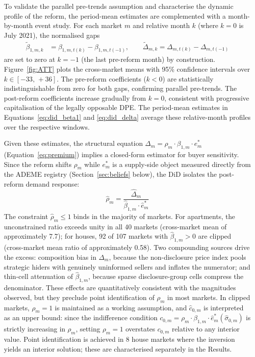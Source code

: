 \documentclass[10pt,letterpaper]{bp-template-concise}
\begin{document}
To validate the parallel pre-trends assumption and characterise the dynamic profile of the reform, the period-mean estimates are complemented with a month-by-month event study. For each market $m$ and relative month $k$ (where $k=0$ is July 2021), the normalised gaps
\begin{align}
\tilde\beta_{1,m,k} &= \beta_{1,m,t(k)} - \beta_{1,m,t(-1)}, \qquad
\tilde\Delta_{m,k}  = \Delta_{m,t(k)}  - \Delta_{m,t(-1)}
\end{align}
are set to zero at $k=-1$ (the last pre-reform month) by construction. Figure~\ref{fig:ATT} plots the cross-market means with 95\% confidence intervals over $k\in[-33,\,+36]$. The pre-reform coefficients ($k<0$) are statistically indistinguishable from zero for both gaps, confirming parallel pre-trends. The post-reform coefficients increase gradually from $k=0$, consistent with progressive capitalisation of the legally opposable DPE. The period-mean estimates in Equations~\eqref{eq:did_beta1} and \eqref{eq:did_delta} average these relative-month profiles over the respective windows.

Given these estimates, the structural equation $\Delta_m = \rho_m\cdot\beta_{1,m}\cdot e^*_m$ (Equation~\eqref{eq:premium}) implies a closed-form estimator for buyer sensitivity. Since the reform shifts $\rho_m$ while $e^*_m$ is a supply-side object measured directly from the ADEME registry (Section~\ref{sec:beliefs} below), the DiD isolates the post-reform demand response:
\begin{equation}
    \hat\rho_m = \frac{\hat\Delta_m}{\hat\beta_{1,m} \cdot \hat{e}^*_m}
    \label{eq:rho_estimator}
\end{equation}
The constraint $\hat\rho_m \leq 1$ binds in the majority of markets. For apartments, the unconstrained ratio exceeds unity in all 40 markets (cross-market mean of approximately 7.7); for houses, 92 of 107 markets with $\hat\beta_{1,m}>0$ are clipped (cross-market mean ratio of approximately 0.58). Two compounding sources drive the excess: composition bias in $\hat\Delta_m$, because the non-disclosure price index pools strategic hiders with genuinely uninformed sellers and inflates the numerator; and thin-cell attenuation of $\hat\beta_{1,m}$, because sparse disclosure-group cells compress the denominator. These effects are quantitatively consistent with the magnitudes observed, but they preclude point identification of $\rho_m$ in most markets. In clipped markets, $\rho_m = 1$ is maintained as a working assumption, and $\hat{c}_{0,m}$ is interpreted as an upper bound: since the indifference condition $c_{0,m} = \rho_m\cdot\beta_{1,m}\cdot\hat{e}^*_m(\hat\sigma_{0,m})$ is strictly increasing in $\rho_m$, setting $\rho_m = 1$ overstates $c_{0,m}$ relative to any interior value. Point identification is achieved in 8 house markets where the inversion yields an interior solution; these are characterised separately in the Results.
\end{document}
